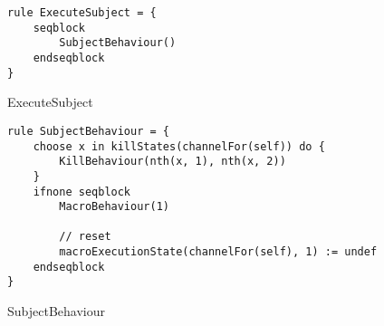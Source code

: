 \begin{listing}[H]
\begin{verbatim}
rule ExecuteSubject = {
    seqblock
        SubjectBehaviour()
    endseqblock
}

\end{verbatim}
\caption{ExecuteSubject}
\label{lst:asm:ExecuteSubject}
\end{listing}




\begin{listing}[H]
\begin{verbatim}
rule SubjectBehaviour = {
    choose x in killStates(channelFor(self)) do {
        KillBehaviour(nth(x, 1), nth(x, 2))
    }
    ifnone seqblock
        MacroBehaviour(1)

        // reset
        macroExecutionState(channelFor(self), 1) := undef
    endseqblock
}
\end{verbatim}
\caption{SubjectBehaviour}
\label{lst:asm:SubjectBehaviour}
\end{listing}




